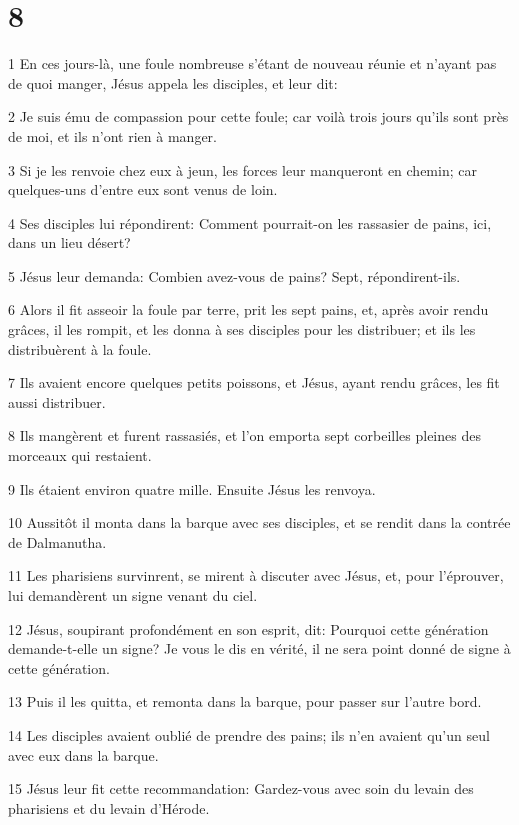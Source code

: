 \chapter{8}

\par 1 En ces jours-là, une foule nombreuse s'étant de nouveau réunie et n'ayant pas de quoi manger, Jésus appela les disciples, et leur dit:
\par 2 Je suis ému de compassion pour cette foule; car voilà trois jours qu'ils sont près de moi, et ils n'ont rien à manger.
\par 3 Si je les renvoie chez eux à jeun, les forces leur manqueront en chemin; car quelques-uns d'entre eux sont venus de loin.
\par 4 Ses disciples lui répondirent: Comment pourrait-on les rassasier de pains, ici, dans un lieu désert?
\par 5 Jésus leur demanda: Combien avez-vous de pains? Sept, répondirent-ils.
\par 6 Alors il fit asseoir la foule par terre, prit les sept pains, et, après avoir rendu grâces, il les rompit, et les donna à ses disciples pour les distribuer; et ils les distribuèrent à la foule.
\par 7 Ils avaient encore quelques petits poissons, et Jésus, ayant rendu grâces, les fit aussi distribuer.
\par 8 Ils mangèrent et furent rassasiés, et l'on emporta sept corbeilles pleines des morceaux qui restaient.
\par 9 Ils étaient environ quatre mille. Ensuite Jésus les renvoya.
\par 10 Aussitôt il monta dans la barque avec ses disciples, et se rendit dans la contrée de Dalmanutha.
\par 11 Les pharisiens survinrent, se mirent à discuter avec Jésus, et, pour l'éprouver, lui demandèrent un signe venant du ciel.
\par 12 Jésus, soupirant profondément en son esprit, dit: Pourquoi cette génération demande-t-elle un signe? Je vous le dis en vérité, il ne sera point donné de signe à cette génération.
\par 13 Puis il les quitta, et remonta dans la barque, pour passer sur l'autre bord.
\par 14 Les disciples avaient oublié de prendre des pains; ils n'en avaient qu'un seul avec eux dans la barque.
\par 15 Jésus leur fit cette recommandation: Gardez-vous avec soin du levain des pharisiens et du levain d'Hérode.
